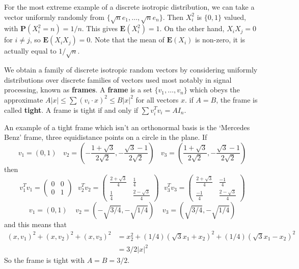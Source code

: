 \begin{example}
    For the most extreme example of a discrete isotropic distribution, we can take a vector uniformly randomly from $\{ \sqrt{n} e_1, \dots, \sqrt{n} e_n \}$. Then $X_i^2$ is $\{ 0,1 \}$ valued, with $\mathbf{P}(X_i^2 = n) = 1/n$. This gives $\mathbf{E}(X_i^2) = 1$. On the other hand, $X_iX_j = 0$ for $i \neq j$, so $\mathbf{E}(X_iX_j) = 0$. Note that the mean of $\mathbf{E}(X_i)$ is non-zero, it is actually equal to $1/\sqrt{n}$.
\end{example}

We obtain a family of discrete isotropic random vectors by considering uniformly distributions over discrete families of vectors used most notably in signal processing, known as {\bf frames}. A {\bf frame} is a set $\{ v_1, \dots, v_n \}$ which obeys the approximate $A |x| \leq \sum (v_i \cdot x)^2 \leq B |x|^2$ for all vectors $x$. if $A = B$, the frame is called {\bf tight}. A frame is tight if and only if $\sum v_i^T v_i = A I_n$.

\begin{example}
    An example of a tight frame which isn't an orthonormal basis is the `Mercedes Benz' frame, three equidistance points on a circle in the plane. If
    \[ v_1 = (0,1)\ \ \ \ v_2 = \left(-\frac{1 + \sqrt{3}}{2\sqrt{2}}, -\frac{\sqrt{3} - 1}{2\sqrt{2}} \right)\ \ \ \ v_3 = \left(\frac{1 + \sqrt{3}}{2\sqrt{2}}, -\frac{\sqrt{3} - 1}{2\sqrt{2}} \right) \]
    then
    \[ v_1^T v_1 = \begin{pmatrix} 0 & 0 \\ 0 & 1 \end{pmatrix}\ \ \ v_2^T v_2 = \begin{pmatrix} \frac{2 + \sqrt{3}}{4} & \frac{1}{4} \\ \frac{1}{4} & \frac{2 - \sqrt{3}}{4} \end{pmatrix}\ \ \ v_3^T v_3 = \begin{pmatrix} \frac{2 + \sqrt{3}}{4} & \frac{-1}{4} \\ \frac{-1}{4} & \frac{2 - \sqrt{3}}{4} \end{pmatrix} \]
    \[ v_1 = (0,1)\ \ \ \ \ v_2 = (-\sqrt{3/4},-\sqrt{1/4})\ \ \ \ \ v_3 = (\sqrt{3/4},-\sqrt{1/4}) \]
    and this means that
    \begin{align*}
        (x,v_1)^2 + (x,v_2)^2 + (x,v_3)^2 &= x_2^2 + (1/4) (\sqrt{3} x_1 + x_2)^2 + (1/4) ( \sqrt{3} x_1 - x_2)^2\\
        &= 3/2 |x|^2
    \end{align*}
    So the frame is tight with $A = B = 3/2$.
\end{example}

